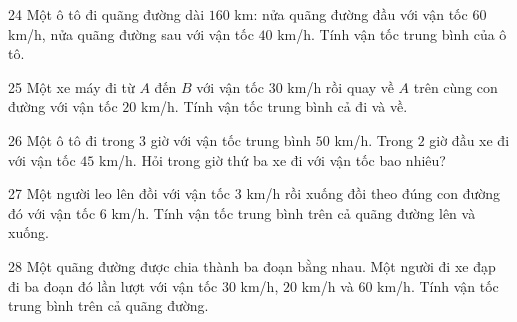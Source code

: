 \gap
\begin{probbox}{24}{\relax}
Một ô tô đi quãng đường dài $160$ km: nửa quãng đường đầu với vận tốc $60$ km/h, nửa quãng đường sau với vận tốc $40$ km/h. Tính vận tốc trung bình của ô tô.
\end{probbox}
\gap
\begin{probbox}{25}{\relax}
Một xe máy đi từ $A$ đến $B$ với vận tốc $30$ km/h rồi quay về $A$ trên cùng con đường với vận tốc $20$ km/h. Tính vận tốc trung bình cả đi và về.
\end{probbox}
\gap
\begin{probbox}{26}{\relax}
Một ô tô đi trong $3$ giờ với vận tốc trung bình $50$ km/h. Trong $2$ giờ đầu xe đi với vận tốc $45$ km/h. Hỏi trong giờ thứ ba xe đi với vận tốc bao nhiêu?
\end{probbox}
\gap
\begin{probbox}{27}{\relax}
Một người leo lên đồi với vận tốc $3$ km/h rồi xuống đồi theo đúng con đường đó với vận tốc $6$ km/h. Tính vận tốc trung bình trên cả quãng đường lên và xuống.
\end{probbox}
\gap
\begin{probbox}{28}{\relax}
Một quãng đường được chia thành ba đoạn bằng nhau. Một người đi xe đạp đi ba đoạn đó lần lượt với vận tốc $30$ km/h, $20$ km/h và $60$ km/h. Tính vận tốc trung bình trên cả quãng đường.
\end{probbox}
